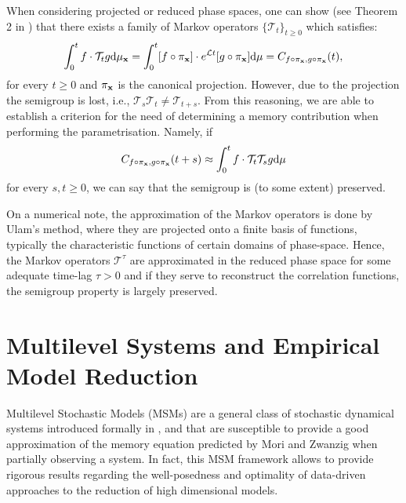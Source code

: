 \documentclass[12pt]{article}
\begin{document}
When considering projected or reduced phase spaces, one can show (see Theorem 2 in \cite{chekroun2019c}) that there exists a family of Markov operators $\{\mathcal{T}_t\}_{t\geq 0}$ which satisfies:
\begin{equation}\label{criterion memory}
\int _{0}^tf\cdot \mathcal{T}_tg\mathrm{d} \mu_{\mathbf{x}} = \int _{0}^t[f\circ \pi_{\mathbf{x}}]\cdot e^{\mathcal{L} t}[g\circ \pi _{\mathbf{x}}] \mathrm{d} \mu = C_{f\circ \pi_{\mathbf{x}},g \circ \pi_{\mathbf{x}}}(t),
\end{equation}
for every $t\geq0$ and $\pi_{\mathbf{x}}$ is the canonical projection. However, due to the projection the semigroup is lost, i.e., $\mathcal{T}_{s}\mathcal{T}_t\neq \mathcal{T}_{t+s}$. From this reasoning, we are able to establish a criterion for the need of determining a memory contribution when performing the parametrisation. Namely, if
\begin{equation}\label{criterion memory effects}
	C_{f\circ \pi_{\mathbf{x}},g \circ \pi_{\mathbf{x}}}(t+s) \approx \int _{0}^tf\cdot \mathcal{T}_t\mathcal{T}_sg\mathrm{d} \mu
\end{equation}
for every $s,t \geq 0$, we can say that the semigroup is (to some extent) preserved.

On a numerical note, the approximation of the Markov operators is done by Ulam's method, where they are projected onto a finite basis of functions, typically the characteristic functions of certain domains of phase-space. Hence, the Markov operators $\mathcal{T}^{\tau}$ are approximated in the reduced phase space for some adequate time-lag $\tau>0$ and if they serve to reconstruct the correlation functions, the semigroup property is largely preserved.

\section{Multilevel Systems and Empirical Model Reduction}

Multilevel Stochastic Models (MSMs) are a general class of stochastic dynamical systems introduced formally in \cite{kondrashovdata2015}, and that are susceptible to provide a good approximation of the memory equation predicted by Mori and Zwanzig when partially observing a system. In fact, this MSM framework allows to provide rigorous results regarding the well-posedness and optimality of data-driven approaches to the reduction of high dimensional models. 
\end{document}
